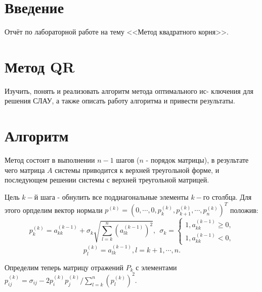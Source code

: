 \documentclass[14pt, titlepage,fleqn]{extarticle}
\begin{document}
	

	
	
	\newpage
	
	\tableofcontents   
	\clearpage
	\section*{Введение}
	Отчёт по лабораторной работе на тему <<Метод квадратного корня>>.	
	\newpage









	\section*{Метод QR}
	Изучить, понять и реализовать алгоритм метода оптимального ис-
	ключения для решения СЛАУ, а также описать работу алгоритма и
	привести результаты.

	\section*{Алгоритм}
	Метод состоит в выполнении $n-1$ шагов ($n$ - порядок матрицы), в результате чего матрица $A$ системы приводится к верхней треугольной форме, и последующем решении системы с верхней треугольной матрицей.
	
	Цель $k-$й шага - обнулить все поддиагональные элементы $k-$го столбца. Для этого орпделим вектор нормали $p^{(k)} = (0, \cdots, 0, p^{(k)}_{k}, p^{(k)}_{k+1}, \cdots, p^{(k)}_{n})^T$ положив:
	\[p^{(k)}_{k} = a^{(k-1)}_{kk} + \sigma_k \sqrt{\sum^{n}_{l=k}(a^{(k-1)}_{lk})^2}, ~~ \sigma_k = \begin{cases}
		1, a^{(k-1)}_{kk} \geq 0,\\
		1, a^{(k-1)}_{kk} < 0 ,
	\end{cases}\]
	\[p^{(k)}_{l} = a^{(k-1)}_{lk}, l = k + 1, \cdots, n.\]
	
	Определим теперь матрицу отражений $P_k$ с элементами $p^{(k)}_{ij} =\sigma_{ij}- 2p^{(k)}_{i}p^{(k)}_{j}/ \sum^{n}_{l=k}(p^{(k)}_{l})^2.$
\end{document}
